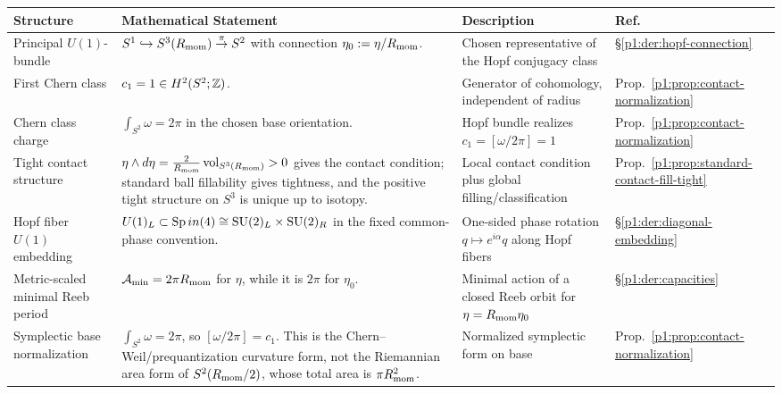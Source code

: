\documentclass[11pt]{article}
\begin{document}
\begin{table}[p]
\centering
\footnotesize
\begingroup
\renewcommand{\arraystretch}{1.2}
\setlength{\tabcolsep}{2pt}

\begin{tabular}{|
  L{2.7cm}|
  L{\dimexpr\linewidth-2.7cm-3.5cm-2.25cm-8\arrayrulewidth\relax}|
  L{3.5cm}|
  C{2.25cm}|
}
\hline
\textbf{Structure} & \textbf{Mathematical Statement} & \textbf{Description} & \textbf{Ref.} \\
\hline

Principal \(U(1)\)-bundle
& \(S^1 \hookrightarrow S^3(R_{\mathrm{mom}}) \overset{\pi}{\to} S^2\) with connection
  \(\eta_0:=\eta/R_{\mathrm{mom}}\).
& Chosen representative of the Hopf conjugacy class
& \S\ref{p1:der:hopf-connection} \\
\hline

First Chern class
& \(c_1 = 1 \in H^2(S^2;\mathbb{Z})\).
& Generator of cohomology, independent of radius
& Prop.~\ref{p1:prop:contact-normalization} \\
\hline

Chern class charge
& \(\displaystyle\int_{S^2}\omega = 2\pi\) in the chosen base orientation.
& Hopf bundle realizes \(c_1=[\omega/2\pi]=1\)
& Prop.~\ref{p1:prop:contact-normalization} \\
\hline

Tight contact structure
& \(\eta \wedge d\eta = \frac{2}{R_{\mathrm{mom}}}\operatorname{vol}_{S^3(R_{\mathrm{mom}})} > 0\) gives the
  contact condition; standard ball fillability gives tightness, and the
  positive tight structure on \(S^3\) is unique up to isotopy.
& Local contact condition plus global filling/classification
& Prop.~\ref{p1:prop:standard-contact-fill-tight} \\
\hline

Hopf fiber \(U(1)\) embedding
& \(U(1)_L\subset\operatorname{Sp}in(4)\cong\mathrm{SU}(2)_L\times\mathrm{SU}(2)_R\) in the fixed
  common-phase convention.
& One-sided phase rotation \(q\mapsto e^{i\alpha}q\) along Hopf fibers
& \S\ref{p1:der:diagonal-embedding} \\
\hline

Metric-scaled minimal Reeb period
& \(\mathcal A_{\min}=2\pi R_{\mathrm{mom}}\) for \(\eta\), while it is \(2\pi\) for
  \(\eta_0\).
& Minimal action of a closed Reeb orbit for \(\eta=R_{\mathrm{mom}}\eta_0\)
& \S\ref{p1:der:capacities} \\
\hline

Symplectic base normalization
& \(\displaystyle\int_{S^2}\omega = 2\pi\), so
  \([\omega/2\pi]=c_1\).  This is the
  Chern--\allowbreak Weil/prequantization curvature form, not the Riemannian
  area form of \(S^2(R_{\mathrm{mom}}/2)\), whose total area is \(\pi R_{\mathrm{mom}}^2\).
& Normalized symplectic form on base
& Prop.~\ref{p1:prop:contact-normalization} \\
\hline


\end{tabular}
\end{table}
\end{document}

